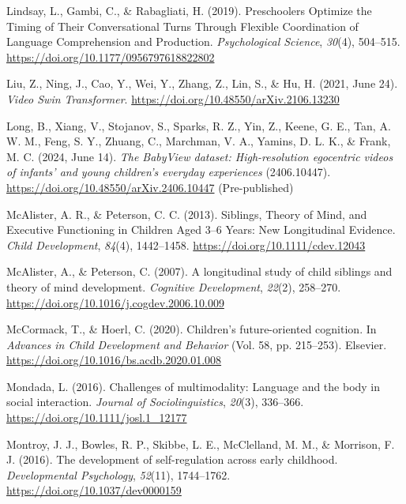 \documentclass[
  english,
  12pt,
  man,floatsintext]{apa6}
\newlength{\cslhangindent}
\newenvironment{CSLReferences}[2] %
 {\begin{list}{}{%
  \setlength{\itemindent}{0pt}
  \setlength{\leftmargin}{0pt}
  \setlength{\parsep}{0pt}
  \ifodd #1
   \setlength{\leftmargin}{\cslhangindent}
   \setlength{\itemindent}{-1\cslhangindent}
  \fi
  \setlength{\itemsep}{#2\baselineskip}}}
 {\end{list}}
\begin{document}
\begin{CSLReferences}{1}{0}
Lindsay, L., Gambi, C., \& Rabagliati, H. (2019). Preschoolers {Optimize} the {Timing} of {Their Conversational Turns Through Flexible Coordination} of {Language Comprehension} and {Production}. \emph{Psychological Science}, \emph{30}(4), 504--515. \url{https://doi.org/10.1177/0956797618822802}

Liu, Z., Ning, J., Cao, Y., Wei, Y., Zhang, Z., Lin, S., \& Hu, H. (2021, June 24). \emph{Video {Swin Transformer}}. \url{https://doi.org/10.48550/arXiv.2106.13230}

Long, B., Xiang, V., Stojanov, S., Sparks, R. Z., Yin, Z., Keene, G. E., Tan, A. W. M., Feng, S. Y., Zhuang, C., Marchman, V. A., Yamins, D. L. K., \& Frank, M. C. (2024, June 14). \emph{The {BabyView} dataset: {High}-resolution egocentric videos of infants' and young children's everyday experiences} (2406.10447). \url{https://doi.org/10.48550/arXiv.2406.10447} (Pre-published)

McAlister, A. R., \& Peterson, C. C. (2013). Siblings, {Theory} of {Mind}, and {Executive Functioning} in {Children Aged} 3--6 {Years}: {New Longitudinal Evidence}. \emph{Child Development}, \emph{84}(4), 1442--1458. \url{https://doi.org/10.1111/cdev.12043}

McAlister, A., \& Peterson, C. (2007). A longitudinal study of child siblings and theory of mind development. \emph{Cognitive Development}, \emph{22}(2), 258--270. \url{https://doi.org/10.1016/j.cogdev.2006.10.009}

McCormack, T., \& Hoerl, C. (2020). Children's future-oriented cognition. In \emph{Advances in {Child Development} and {Behavior}} (Vol. 58, pp. 215--253). Elsevier. \url{https://doi.org/10.1016/bs.acdb.2020.01.008}

Mondada, L. (2016). Challenges of multimodality: {Language} and the body in social interaction. \emph{Journal of Sociolinguistics}, \emph{20}(3), 336--366. \url{https://doi.org/10.1111/josl.1_12177}

Montroy, J. J., Bowles, R. P., Skibbe, L. E., McClelland, M. M., \& Morrison, F. J. (2016). The development of self-regulation across early childhood. \emph{Developmental Psychology}, \emph{52}(11), 1744--1762. \url{https://doi.org/10.1037/dev0000159}


\end{CSLReferences}
\end{document}
